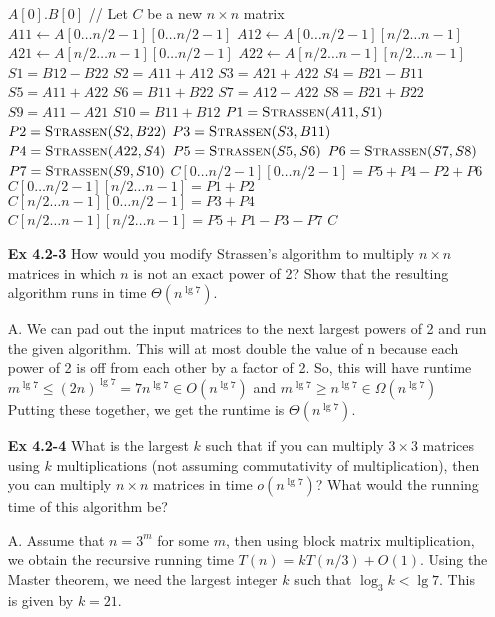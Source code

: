 \documentclass[fontsize=12pt,paper=a4]{book}
\renewcommand{\Comment}[1]{// #1}
\begin{document}
\begin{enumerate}
\begin{algorithm}
\begin{algorithmic}
         \Return $A[0] . B[0]$
         \EndIf
         \Comment{Let $C$ be a new $n \times n$ matrix}
         \State $A11 \gets A[0 \dots n/2-1][0 \dots n/2-1]$
         \State $A12 \gets A[0 \dots n/2-1][n/2 \dots n-1]$
         \State $A21 \gets A[n/2 \dots n-1][0 \dots n/2-1]$
         \State $A22 \gets A[n/2 \dots n-1][n/2 \dots n-1]$
         \State $S1 = B12 - B22$
         \State $S2 = A11 + A12$
         \State $S3 = A21 + A22$
         \State $S4 = B21 - B11$
         \State $S5 = A11 + A22$
         \State $S6 = B11 + B22$
         \State $S7 = A12 - A22$
         \State $S8 = B21 + B22$
         \State $S9 = A11 - A21$
         \State $S10 = B11 + B12$
         \State $P1 = \Call{Strassen}{A11, S1}$
         \State $P2 = \Call{Strassen}{S2, B22}$
         \State $P3 = \Call{Strassen}{S3, B11}$
         \State $P4 = \Call{Strassen}{A22, S4}$
         \State $P5 = \Call{Strassen}{S5, S6}$
         \State $P6 = \Call{Strassen}{S7, S8}$
         \State $P7 = \Call{Strassen}{S9, S10}$
         \State $C[0 \dots n/2-1][0 \dots n/2-1] = P5 + P4 - P2 + P6$
         \State $C[0 \dots n/2-1][n/2 \dots n-1] = P1 + P2$
         \State $C[n/2 \dots n-1][0 \dots n/2-1] = P3 + P4$
         \State $C[n/2 \dots n-1][n/2 \dots n-1] = P5 + P1 - P3 - P7$
         \State \Return $C$
         \EndProcedure
        \end{algorithmic}
       \end{algorithm}
       
 \item[\textbf{Ex 4.2-3}]
       How would you modify Strassen’s algorithm to multiply $n \times n$ matrices in which $n$ is not an exact power of 2? Show that the resulting algorithm runs in time $\Theta(n^{\lg 7})$.
 \item[A.]
       We can pad out the input matrices to the next largest powers of 2 and run the given algorithm. This will at most double the value of n because each power of 2 is off from each other by a factor of 2. So, this will have runtime \\
       $m^{\lg 7} \leq (2n)^{\lg 7} = 7n^{\lg 7} \in O(n^{\lg 7})$ and $m^{\lg 7} \geq n^{\lg 7} \in \Omega(n^{\lg 7})$ \\
       Putting these together, we get the runtime is $\Theta(n^{\lg 7})$.
       
 \item[\textbf{Ex 4.2-4}]
       What is the largest $k$ such that if you can multiply $3 \times 3$ matrices using $k$ multiplications (not assuming commutativity of multiplication), then you can multiply $n \times n$ matrices in time $o(n^{\lg 7})$? What would the running time of this algorithm be?
 \item[A.]
       Assume that $n=3^m$ for some $m$, then using block matrix multiplication, we obtain the recursive running time $T(n) = kT(n/3) + O(1)$. Using the Master theorem, we need the largest integer $k$ such that $\log_3 k < \lg 7$. This is given by $k=21$.
       

\end{enumerate}
\end{document}
